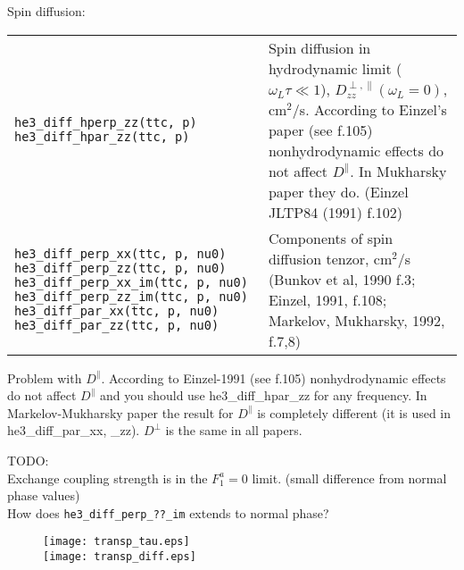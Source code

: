 \documentclass[a4paper]{article}
\begin{document}
Spin diffusion:

\medskip
\noindent\begin{tabular}{p{6cm}p{10cm}}
\tt he3\_diff\_hperp\_zz(ttc, p)\newline
\tt he3\_diff\_hpar\_zz(ttc, p)
& Spin diffusion in hydrodynamic limit ($\omega_L \tau \ll 1$),
  $D^{\perp,\parallel}_{zz}(\omega_L=0)$, cm$^2$/s. According to Einzel's
  paper (see f.105) nonhydrodynamic effects do not affect $D^\parallel$.
  In Mukharsky paper they do.\newline
  {(\small Einzel JLTP84 (1991) f.102)}\\

\tt he3\_diff\_perp\_xx(ttc, p, nu0)\newline
\tt he3\_diff\_perp\_zz(ttc, p, nu0)\newline
\tt he3\_diff\_perp\_xx\_im(ttc, p, nu0)\newline
\tt he3\_diff\_perp\_zz\_im(ttc, p, nu0)\newline
\tt he3\_diff\_par\_xx(ttc, p, nu0)\newline
\tt he3\_diff\_par\_zz(ttc, p, nu0)\newline
&Components of spin diffusion tenzor, cm$^2$/s\newline
{\small(Bunkov et al, 1990 f.3; Einzel, 1991, f.108;\newline
Markelov, Mukharsky, 1992, f.7,8)}\\
\end{tabular}
\medskip

Problem with $D^\parallel$. According to Einzel-1991 (see f.105)
nonhydrodynamic effects do not affect $D^\parallel$ and you should use
he3\_diff\_hpar\_zz for any frequency.
In Markelov-Mukharsky paper the result for $D^\parallel$ is completely
different (it is used in he3\_diff\_par\_xx, \_zz).
$D^\perp$ is the same in all papers.


\noindent TODO:\\
Exchange coupling strength is in the $F_1^a = 0$ limit. (small difference from normal phase values)\\
How does {\tt he3\_diff\_perp\_??\_im} extends to normal phase?\\

\begin{figure}[p]
\texttt{[image: transp\_tau.eps]}\\
\texttt{[image: transp\_diff.eps]}
\end{figure}

\eject
\end{document}
